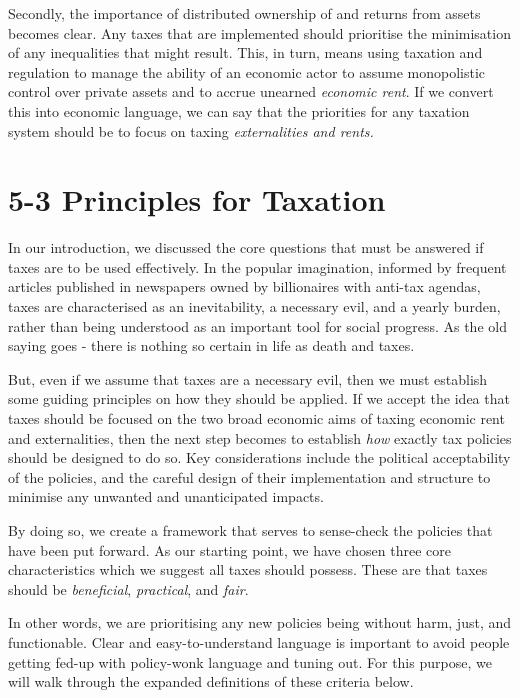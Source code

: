 \documentclass[]{tufte-handout}
\begin{document}
Secondly, the importance of distributed ownership of and returns from
assets becomes clear. Any taxes that are implemented should prioritise
the minimisation of any inequalities that might result. This, in turn,
means using taxation and regulation to manage the ability of an economic
actor to assume monopolistic control over private assets and to accrue
unearned \emph{economic rent}. If we convert this into economic
language, we can say that the priorities for any taxation system should
be to focus on taxing \emph{externalities and rents.}

\hypertarget{principles-for-taxation}{%
\section{5-3 Principles for Taxation}\label{principles-for-taxation}}

In our introduction, we discussed the core questions that must be
answered if taxes are to be used effectively. In the popular
imagination, informed by frequent articles published in newspapers owned
by billionaires with anti-tax agendas, taxes are characterised as an
inevitability, a necessary evil, and a yearly burden, rather than being
understood as an important tool for social progress. As the old saying
goes - there is nothing so certain in life as death and taxes.

But, even if we assume that taxes are a necessary evil, then we must
establish some guiding principles on how they should be applied. If we
accept the idea that taxes should be focused on the two broad economic
aims of taxing economic rent and externalities, then the next step
becomes to establish \emph{how} exactly tax policies should be designed
to do so. Key considerations include the political acceptability of the
policies, and the careful design of their implementation and structure
to minimise any unwanted and unanticipated impacts.

By doing so, we create a framework that serves to sense-check the
policies that have been put forward. As our starting point, we have
chosen three core characteristics which we suggest all taxes should
possess. These are that taxes should be \emph{beneficial},
\emph{practical}, and \emph{fair}.

In other words, we are prioritising any new policies being without harm,
just, and functionable. Clear and easy-to-understand language is
important to avoid people getting fed-up with policy-wonk language and
tuning out. For this purpose, we will walk through the expanded
definitions of these criteria below.
\end{document}
